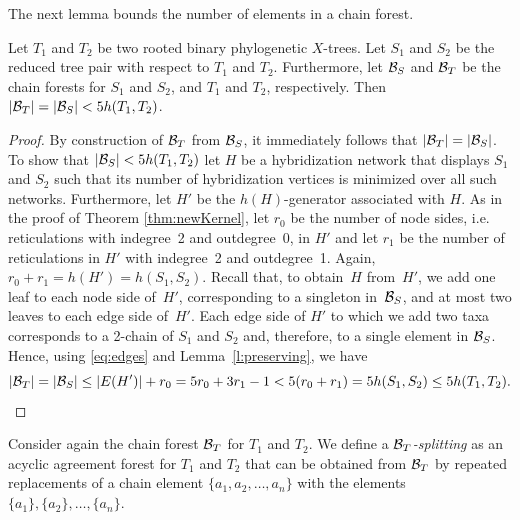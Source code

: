 The next lemma bounds the number of elements in a chain forest.

\begin{lemma}\label{l:B_bound}
Let $T_1$ and $T_2$ be two rooted binary phylogenetic $X$-trees. Let $S_1$ and $S_2$ be the reduced tree pair with respect to $T_1$ and $T_2$. Furthermore, let ${\mathcal B}_S$ and ${\mathcal B}_T$ be the chain forests for $S_1$ and $S_2$, and $T_1$ and $T_2$, respectively. Then $|{\mathcal B}_T| =|{\mathcal B}_S|< 5h(T_1,T_2)$.
\end{lemma}

\begin{proof}
By construction of ${\mathcal B}_T$ from ${\mathcal B}_S$, it immediately follows that $|{\mathcal B}_T| =|{\mathcal B}_S|$. To show that $|{\mathcal B}_S|< 5h(T_1,T_2)$ let $H$ be a hybridization network that displays $S_1$ and $S_2$ such that its number of hybridization vertices is minimized over all such networks. Furthermore, let $H'$ be the $h(H)$-generator associated with $H$.
As in the proof of Theorem \ref{thm:newKernel}, let $r_0$ be the number of node sides, i.e. reticulations with indegree~2 and outdegree~0, in $H'$ and let $r_1$ be the number of reticulations in $H'$ with indegree~2 and outdegree~1. Again, $r_0 + r_1 = h(H')= h(S_1,S_2)$. Recall that, to obtain~$H$ from~$H'$, we add one leaf to each node side of~$H'$, corresponding to a singleton in~${\mathcal B}_S$, and at most two leaves to each edge side of~$H'$. Each edge side of $H'$ to which we add two taxa corresponds to a 2-chain of $S_1$ and $S_2$ and, therefore, to a single element in ${\mathcal B}_S$. Hence, using \eqref{eq:edges} and Lemma~\ref{l:preserving}, we have
\[|{\mathcal B}_T|=|{\mathcal B}_S|  \leq  |E(H')| +r_0 = 5r_0 + 3r_1 -1 < 5(r_0+r_1) = 5 h(S_1,S_2) \leq 5 h(T_1,T_2).\]
\end{proof}

Consider again the chain forest ${\mathcal B}_T$ for $T_1$ and $T_2$. We define a {\it ${\mathcal B}_T$-splitting} as an acyclic agreement forest for $T_1$ and $T_2$ that can be obtained from ${\mathcal B}_T$ by repeated replacements of a chain element $\{a_1,a_2,\ldots,a_n\}$ with the elements $\{a_1\},\{a_2\},\ldots,\{a_n\}$.

